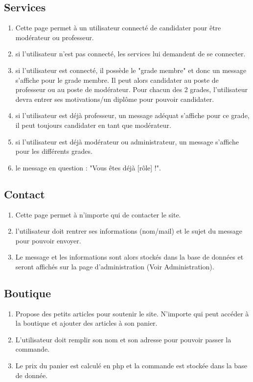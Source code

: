 \documentclass[12pt,a4paper]{article}
\begin{document}
\subsection{Services}
\begin{enumerate}
    \item Cette page permet à un utilisateur connecté de candidater pour être modérateur ou professeur.
    \item si l'utilisateur n'est pas connecté, les services lui demandent de se connecter.
    \item si l'utilisateur est connecté, il possède le "grade membre" et donc un message s'affiche pour le grade membre. Il peut alors candidater au poste de professeur ou au poste de modérateur. Pour chacun des 2 grades, l'utilisateur devra entrer ses motivations/un diplôme pour pouvoir candidater.
    \item si l'utilisateur est déjà professeur, un message adéquat s'affiche pour ce grade, il peut toujours candidater en tant que modérateur.
    \item si l'utilisateur est déjà modérateur ou administrateur, un message s'affiche pour les différents grades.
    \item le message en question : "Vous êtes déjà [rôle] !".
\end{enumerate}
    
\subsection{Contact}
\begin{enumerate}
    \item Cette page permet à n'importe qui de contacter le site.
    \item l'utilisateur doit rentrer ses informations (nom/mail) et le sujet du message pour pouvoir envoyer.
    \item Le message et les informations sont alors stockés dans la base de données et seront affichés sur la page d'administration (Voir Administration).
\end{enumerate}

\subsection{Boutique}
\begin{enumerate}
    \item Propose des petits articles pour soutenir le site. N'importe qui peut accéder à la boutique et ajouter des articles à son panier.
    \item L'utilisateur doit remplir son nom et son adresse pour pouvoir passer la commande.
    \item Le prix du panier est calculé en php et la commande est stockée dans la base de donnée.
\end{enumerate}
\end{document}
